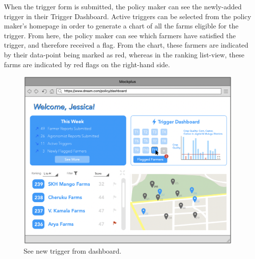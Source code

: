 \clearpage
\noindent
When the trigger form is submitted, the policy maker can see the newly-added trigger in their Trigger Dashboard. Active triggers can be selected from the policy maker's homepage in order to generate a chart of all the farms eligible for the trigger. From here, the policy maker can see which farmers have satisfied the trigger, and therefore received a flag. From the chart, these farmers are indicated by their data-point being marked as red, whereas in the ranking list-view, these farms are indicated by red flags on the right-hand side.


\begin{figure}[H]
\centering
\includegraphics[scale=0.4]{../images_diagrams/mock_ups/dd/Trig06_NewTrigAdded.png}
\caption{\label{fig:mockpolicy_trigEntered}See new trigger from dashboard.}
\end{figure}


